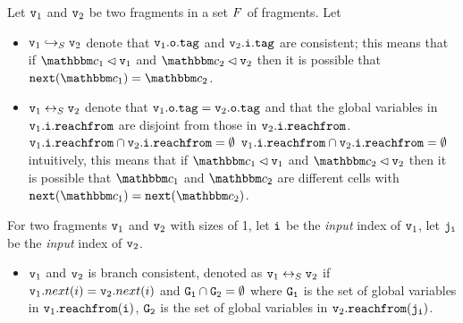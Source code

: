 Let $\mathtt{v}_1$ and $\mathtt{v}_2$ be two fragments in a set $F$ of fragments.
Let
\begin{itemize}
\item  $\mathtt{v}_1 \hookrightarrow_S \mathtt{v}_2$ denote that $\mathtt{v}_1.\mathtt{o}.\mathtt{tag}$
  and $\mathtt{v}_2.\mathtt{i}.\mathtt{tag}$ are consistent;
  this means that if
  $\cell_1 \lhd \frag_1$ and  $\cell_2 \lhd \frag_2$ then it is possible that
  $\mathtt{next}(\cell_1) = \cell_2$.
\item  $\mathtt{v}_1 \leftrightarrow_S \mathtt{v}_2$ denote that $\mathtt{v}_1.\mathtt{o}.\mathtt{tag} = \mathtt{v}_2.\mathtt{o}.\mathtt{tag}$ and that 
  the global variables in  $\mathtt{v}_1.\mathtt{i}.\mathtt{reachfrom}$ are disjoint from
  those in $\mathtt{v}_2.\mathtt{i}.\mathtt{reachfrom}$.
  $\mathtt{v}_1.\mathtt{i}.\mathtt{reachfrom} \cap \mathtt{v}_2.\mathtt{i}.\mathtt{reachfrom} = \emptyset$
  $\mathtt{v}_1.\mathtt{i}.\mathtt{reachfrom} \cap \mathtt{v}_2.\mathtt{i}.\mathtt{reachfrom} = \emptyset$
  intuitively, this means that if
  $\cell_1 \lhd \frag_1$ and  $\cell_2 \lhd \frag_2$ then it is possible that
  $\cell_1$ and $\cell_2$ are different cells with
  $\mathtt{next}(\cell_1) = \mathtt{next}(\cell_2)$.
\end{itemize}
For two fragments $\mathtt{v}_1$ and $\mathtt{v}_2$ with sizes of 1, let $\tt i$ be the {\em input} index of $\mathtt{v}_1$, let $\tt j_i$ be the {\em input} index of $\mathtt{v}_2$.
 \begin{itemize}
 \item $\mathtt{v}_1$ and $\mathtt{v}_2$ is branch consistent, denoted as $\mathtt{v}_1 \leftrightarrow_S \mathtt{v}_2$ if $\mathtt{v}_1.next(i) = \mathtt{v}_2.next(i)$ and $\tt G_1 \cap G_2 = \emptyset$ where $\tt G_1$ is the set of global variables in $\mathtt{v}_1.{\tt reachfrom}(\tt i)$,  $\tt G_2$ is the set of global variables in $\mathtt{v}_2.{\tt reachfrom}(\tt j_i)$.
 \end{itemize}

